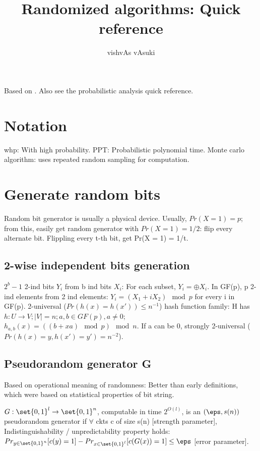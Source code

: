 \documentclass[oneside, article]{memoir}
\title{Randomized algorithms: Quick reference}
\author{vishvAs vAsuki}
\begin{document}
\maketitle

Based on \cite{mitzenmacherUpfal}. Also see the probabilistic analysis quick reference.

\tableofcontents

\chapter{Notation}
whp: With high probability. PPT: Probabilistic polynomial time. Monte carlo algorithm: uses repeated random sampling for computation.

\chapter{Generate random bits}
Random bit generator is usually a physical device. Usually, $Pr(X = 1) = p$; from this, easily get random generator with $Pr(X = 1) = 1/2$: flip every alternate bit. Flippling every t-th bit, get Pr(X = 1) = 1/t.

\section{2-wise independent bits generation}
$2^{b}-1$ 2-ind bits $Y_{i}$ from b ind bits $X_{i}$: For each subset, $Y_{i}=\oplus X_{i}$. In GF(p), p 2-ind elements from 2 ind elements: $Y_{i}=(X_{1}+iX_{2}) \mod p$ for every i in GF(p). 2-universal ($Pr(h(x) = h(x')) \leq n^{-1}$) hash function family: H has $h:U \to V; |V| = n; a, b \in GF(p), a \neq 0$; $h_{a,b}(x) = ((b+xa) \mod p) \mod n$. If a can be 0, strongly 2-universal ($Pr(h(x) = y, h(x')=y') = n^{-2}$).

\section{Pseudorandom generator G}
Based on operational meaning of randomness: Better than early definitions, which were based on statistical properties of bit string.

$G:\set{0,1}^{l} \to \set{0,1}^{n}$, computable in time $2^{O(l)}$, is an $(\eps, s(n))$ pseudorandom generator if $\forall$ ckts c of size s(n) [strength parameter], Indistinguishability / unpredictability property holds: $Pr_{y \in \set{0,1}^{n}}[c(y)=1] - Pr_{x \in \set{0,1}^{l}}[c(G(x))=1] \leq \eps$ [error parameter].
\end{document}
